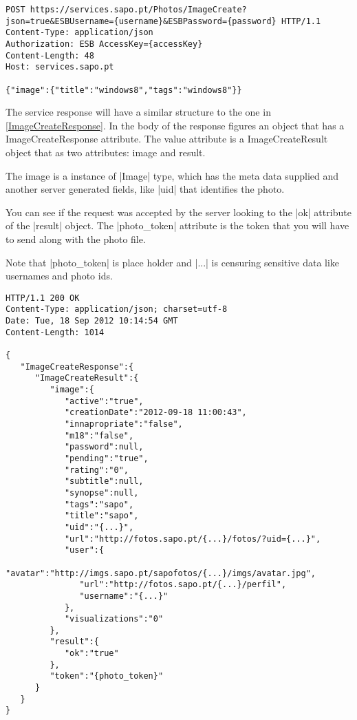 \begin{lstlisting}[label=listpostmetadata,caption=POST the meta data of the photo]
POST https://services.sapo.pt/Photos/ImageCreate?json=true&ESBUsername={username}&ESBPassword={password} HTTP/1.1
Content-Type: application/json
Authorization: ESB AccessKey={accessKey}
Content-Length: 48
Host: services.sapo.pt

{"image":{"title":"windows8","tags":"windows8"}}
\end{lstlisting} 

The service response will have a similar structure to the one in \autoref{ImageCreateResponse}. In the body of the response figures an object that has a ImageCreateResponse attribute. The value attribute is a ImageCreateResult object that as two attributes: image and result.

The image is a instance of \icode|Image| type, which has the meta data supplied and another server generated fields, like \icode|uid| that identifies the photo.

You can see if the request was accepted by the server looking to the \icode|ok| attribute of the \icode|result| object. The \icode|{photo_token}| attribute is the token that you will have to send along with the photo file. 

Note that \icode|{photo_token}| is place holder and \icode|{...}| is censuring sensitive data like usernames and photo ids.

\begin{lstlisting}[label=ImageCreateResponse,caption=Response of the HTTP POST with the meta data]
HTTP/1.1 200 OK
Content-Type: application/json; charset=utf-8
Date: Tue, 18 Sep 2012 10:14:54 GMT
Content-Length: 1014

{
   "ImageCreateResponse":{
      "ImageCreateResult":{
         "image":{
            "active":"true",
            "creationDate":"2012-09-18 11:00:43",
            "innapropriate":"false",
            "m18":"false",
            "password":null,
            "pending":"true",
            "rating":"0",
            "subtitle":null,
            "synopse":null,
            "tags":"sapo",
            "title":"sapo",
            "uid":"{...}",
            "url":"http://fotos.sapo.pt/{...}/fotos/?uid={...}",
            "user":{
               "avatar":"http://imgs.sapo.pt/sapofotos/{...}/imgs/avatar.jpg",
               "url":"http://fotos.sapo.pt/{...}/perfil",
               "username":"{...}"
            },
            "visualizations":"0"
         },
         "result":{
            "ok":"true"
         },
         "token":"{photo_token}"
      }
   }
}
\end{lstlisting}

